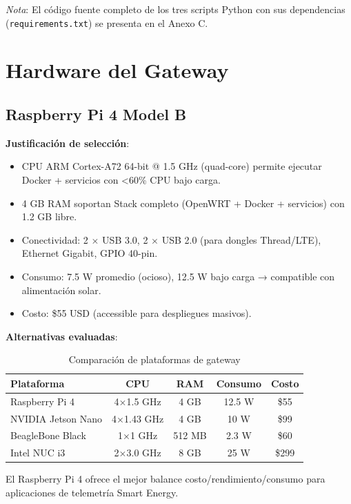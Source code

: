 \textit{Nota}: El código fuente completo de los tres scripts Python con sus dependencias (\texttt{requirements.txt}) se presenta en el Anexo C.

\section{Hardware del Gateway}

\subsection{Raspberry Pi 4 Model B}

\textbf{Justificación de selección}:
\begin{itemize}
    \item CPU ARM Cortex-A72 64-bit @ 1.5 GHz (quad-core) permite ejecutar Docker + servicios con <60\% CPU bajo carga.
    \item 4 GB RAM soportan Stack completo (OpenWRT + Docker + servicios) con 1.2 GB libre.
    \item Conectividad: 2 $\times$ USB 3.0, 2 $\times$ USB 2.0 (para dongles Thread/LTE), Ethernet Gigabit, GPIO 40-pin.
    \item Consumo: 7.5 W promedio (ocioso), 12.5 W bajo carga → compatible con alimentación solar.
    \item Costo: \$55 USD (accessible para despliegues masivos).
\end{itemize}

\textbf{Alternativas evaluadas}:
\begin{table}[h]
\centering
\caption{Comparación de plataformas de gateway}
\begin{tabular}{|l|c|c|c|c|}
\hline
\textbf{Plataforma} & \textbf{CPU} & \textbf{RAM} & \textbf{Consumo} & \textbf{Costo} \\ \hline
Raspberry Pi 4 & 4$\times$1.5 GHz & 4 GB & 12.5 W & \$55 \\ \hline
NVIDIA Jetson Nano & 4$\times$1.43 GHz & 4 GB & 10 W & \$99 \\ \hline
BeagleBone Black & 1$\times$1 GHz & 512 MB & 2.3 W & \$60 \\ \hline
Intel NUC i3 & 2$\times$3.0 GHz & 8 GB & 25 W & \$299 \\ \hline
\end{tabular}
\end{table}

El Raspberry Pi 4 ofrece el mejor balance costo/rendimiento/consumo para aplicaciones de telemetría Smart Energy.

